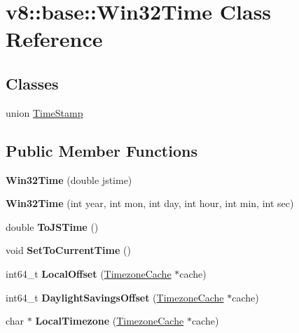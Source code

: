 \hypertarget{classv8_1_1base_1_1_win32_time}{}\section{v8\+:\+:base\+:\+:Win32\+Time Class Reference}
\label{classv8_1_1base_1_1_win32_time}
\subsection*{Classes}
\begin{DoxyCompactItemize}
\item 
union \hyperlink{unionv8_1_1base_1_1_win32_time_1_1_time_stamp}{Time\+Stamp}
\end{DoxyCompactItemize}
\subsection*{Public Member Functions}
\begin{DoxyCompactItemize}
\item 
{\bfseries Win32\+Time} (double jstime)\hypertarget{classv8_1_1base_1_1_win32_time_a9f8e83cbab5a3d25b11cf4371305faf8}{}\label{classv8_1_1base_1_1_win32_time_a9f8e83cbab5a3d25b11cf4371305faf8}

\item 
{\bfseries Win32\+Time} (int year, int mon, int day, int hour, int min, int sec)\hypertarget{classv8_1_1base_1_1_win32_time_a189fecfc6a50f0932db3b0e025f84665}{}\label{classv8_1_1base_1_1_win32_time_a189fecfc6a50f0932db3b0e025f84665}

\item 
double {\bfseries To\+J\+S\+Time} ()\hypertarget{classv8_1_1base_1_1_win32_time_a052f87c337e9d06abe156757e01c4a09}{}\label{classv8_1_1base_1_1_win32_time_a052f87c337e9d06abe156757e01c4a09}

\item 
void {\bfseries Set\+To\+Current\+Time} ()\hypertarget{classv8_1_1base_1_1_win32_time_ab6f3f19dd6479e7286e3d5b9e0089b34}{}\label{classv8_1_1base_1_1_win32_time_ab6f3f19dd6479e7286e3d5b9e0089b34}

\item 
int64\+\_\+t {\bfseries Local\+Offset} (\hyperlink{classv8_1_1base_1_1_timezone_cache}{Timezone\+Cache} $\ast$cache)\hypertarget{classv8_1_1base_1_1_win32_time_a317e80cb271eb52b6e519f02d956b692}{}\label{classv8_1_1base_1_1_win32_time_a317e80cb271eb52b6e519f02d956b692}

\item 
int64\+\_\+t {\bfseries Daylight\+Savings\+Offset} (\hyperlink{classv8_1_1base_1_1_timezone_cache}{Timezone\+Cache} $\ast$cache)\hypertarget{classv8_1_1base_1_1_win32_time_a5ad17206292bc952feb637d33cd16b8c}{}\label{classv8_1_1base_1_1_win32_time_a5ad17206292bc952feb637d33cd16b8c}

\item 
char $\ast$ {\bfseries Local\+Timezone} (\hyperlink{classv8_1_1base_1_1_timezone_cache}{Timezone\+Cache} $\ast$cache)\hypertarget{classv8_1_1base_1_1_win32_time_a622e143d3e250f76ae3709de32181f09}{}\label{classv8_1_1base_1_1_win32_time_a622e143d3e250f76ae3709de32181f09}

\end{DoxyCompactItemize}
